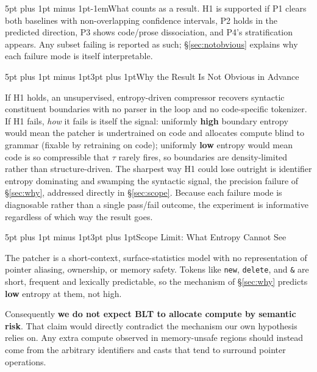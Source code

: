 \documentclass[10pt]{article}
\makeatletter
\renewcommand\subsection{\@startsection{subsection}{2}{0pt}%
  {5pt plus 1pt minus 1pt}{3pt plus 1pt}{\normalfont\normalsize\bfseries}}
\renewcommand\paragraph{\@startsection{paragraph}{4}{0pt}%
  {5pt plus 1pt minus 1pt}{-1em}{\normalfont\normalsize\bfseries}}
\newcommand{\code}[1]{\texttt{\small #1}}
\makeatother
\begin{document}
\paragraph{What counts as a result.} H1 is supported if P1 clears both baselines
with non-overlapping confidence intervals, P2 holds in the predicted direction,
P3 shows code/prose dissociation, and P4's stratification appears. Any subset
failing is reported as such; \S\ref{sec:notobvious} explains why each failure mode
is itself interpretable.

\subsection{Why the Result Is Not Obvious in Advance}
\label{sec:notobvious}

If H1 holds, an unsupervised, entropy-driven compressor recovers syntactic
constituent boundaries with no parser in the loop and no code-specific
tokenizer. If H1 fails, \emph{how} it fails is itself the signal: uniformly
\textbf{high} boundary entropy would mean the patcher is undertrained on code
and allocates compute blind to grammar (fixable by retraining on code);
uniformly \textbf{low} entropy would mean code is so compressible that $\tau$
rarely fires, so boundaries are density-limited rather than structure-driven.
The sharpest way H1 could lose outright is identifier entropy dominating and
swamping the syntactic signal, the precision failure of \S\ref{sec:why},
addressed directly in \S\ref{sec:scope}. Because each failure mode is
diagnosable rather than a single pass/fail outcome, the experiment is
informative regardless of which way the result goes.

\subsection{Scope Limit: What Entropy Cannot See}
\label{sec:scope}

The patcher is a short-context, surface-statistics model with no representation of
pointer aliasing, ownership, or memory safety. Tokens like \code{new},
\code{delete}, \code{*} and \code{\&} are short, frequent and lexically
predictable, so the mechanism of \S\ref{sec:why} predicts \textbf{low} entropy at
them, not high.

Consequently \textbf{we do not expect BLT to allocate compute by semantic risk}.
That claim would directly contradict the mechanism our own hypothesis relies on.
Any extra compute observed in memory-unsafe regions should instead come from the
arbitrary identifiers and casts that tend to surround pointer operations.
\end{document}
